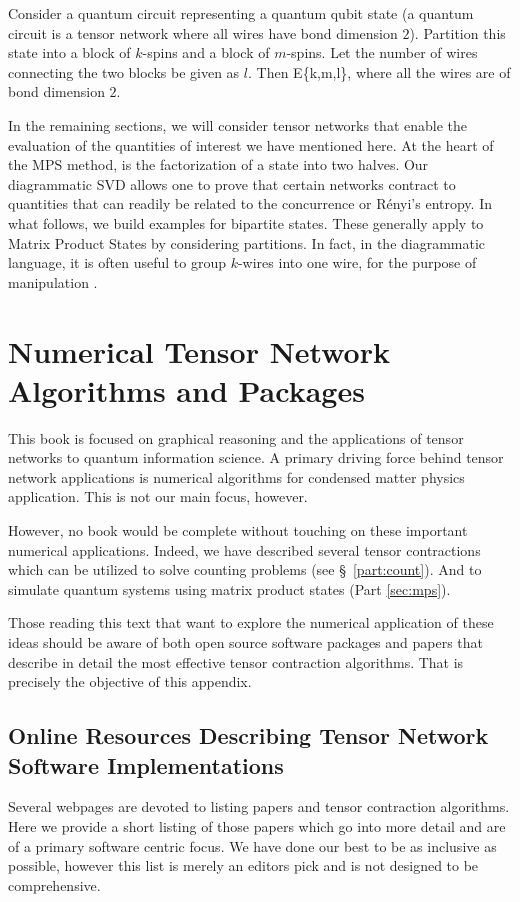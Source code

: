 \begin{remark}
Consider a quantum circuit representing a quantum qubit state (a quantum circuit is a tensor network where all wires have bond dimension $2$).  
Partition this state into a block of $k$-spins and a block of $m$-spins. Let the number of wires connecting the two blocks be given as $l$.  Then 
\be 
E\leq \min\{k,m,l\}, 
\ee 
where all the wires are of bond dimension $2$. 
\end{remark}


In the remaining sections, we will consider tensor networks that enable the evaluation of the quantities of interest we have mentioned here. 
At the heart of the MPS method, is the factorization of a state into two halves.  Our diagrammatic SVD allows one to prove that certain networks contract to 
quantities that can readily be related to the concurrence or R\'{e}nyi's entropy.  In what follows, we build examples for bipartite states.  These generally apply to Matrix Product States 
by considering partitions.  In fact, in the diagrammatic language, it is often useful to group $k$-wires into one wire, for the purpose of manipulation \cite{BB11}.  


\section{Numerical Tensor Network Algorithms and Packages} 

This book is focused on graphical reasoning and the applications of tensor networks to quantum information science.  A primary driving force behind tensor network applications is numerical algorithms for condensed matter physics application.  This is not our main focus, however. 

However, no book would be complete without touching on these important numerical applications.  Indeed, we have described several tensor contractions which can be utilized to solve counting problems (see \S~\ref{part:count}).  And to simulate quantum systems using matrix product states (Part \ref{sec:mps}). 

Those reading this text that want to explore the numerical application of these ideas should be aware of both open source software packages and papers that describe in detail the most effective tensor contraction algorithms.  That is precisely the objective of this appendix.  

\subsection{Online Resources Describing Tensor Network Software Implementations}
Several webpages are devoted to listing papers and tensor contraction algorithms.  Here we provide a short listing of those papers which go into more detail and are of a primary software centric focus.  We have done our best to be as inclusive as possible, however this list is merely an editors pick and is not designed to be comprehensive. 


